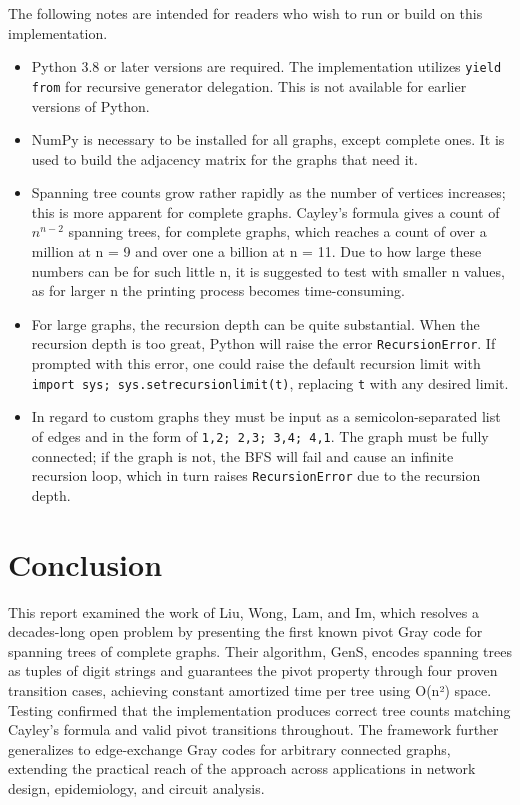 \documentclass{article}
\begin{document}
The following notes are intended for readers who wish to run or build on this implementation. 

\begin{itemize}
    \item Python 3.8 or later versions are required. The implementation utilizes \texttt{yield from} for recursive generator delegation. This is not available for earlier versions of Python.
    \item NumPy is necessary to be installed for all graphs, except complete ones. It is used to build the adjacency matrix for the graphs that need it. 
    \item Spanning tree counts grow rather rapidly as the number of vertices increases; this is more apparent for complete graphs. Cayley's formula gives a count of $n^{n-2}$ spanning trees, for complete graphs, which reaches a count of over a million at n = 9 and over one a billion at n = 11. Due to how large these numbers can be for such little n, it is suggested to test with smaller n values, as for larger n the printing process becomes time-consuming.
    \item For large graphs, the recursion depth can be quite substantial. When the recursion depth is too great, Python will raise the error \texttt{RecursionError}. If prompted with this error, one could raise the default recursion limit with \texttt{import sys; sys.setrecursionlimit(t)}, replacing \texttt{t} with any desired limit.
    \item In regard to custom graphs they must be input as a semicolon-separated list of edges and in the form of \texttt{1,2; 2,3; 3,4; 4,1}. The graph must be fully connected; if the graph is not, the BFS will fail and cause an infinite recursion loop, which in turn raises \texttt{RecursionError} due to the recursion depth.  
\end{itemize}


\section{Conclusion}
This report examined the work of Liu, Wong, Lam, and Im, which resolves a decades-long open problem by presenting the first known pivot Gray code for spanning trees of complete graphs. Their algorithm, GenS, encodes spanning trees as tuples of digit strings and guarantees the pivot property through four proven transition cases, achieving constant amortized time per tree using O(n²) space. Testing confirmed that the implementation produces correct tree counts matching Cayley's formula and valid pivot transitions throughout. The framework further generalizes to edge-exchange Gray codes for arbitrary connected graphs, extending the practical reach of the approach across applications in network design, epidemiology, and circuit analysis.
\end{document}
